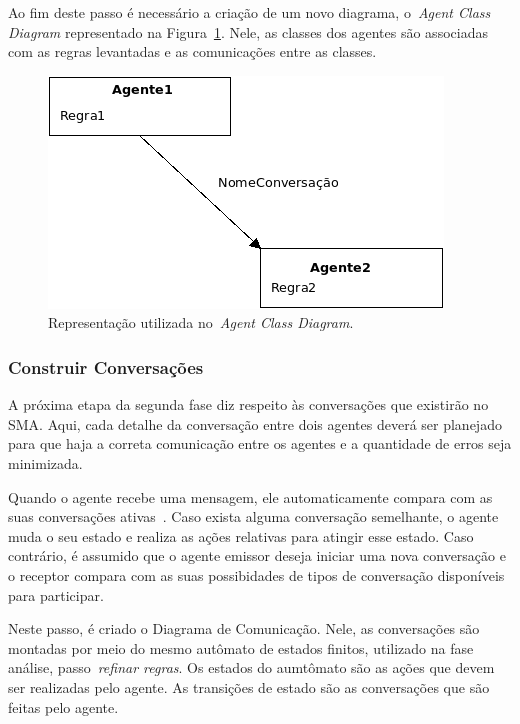 Ao fim deste passo é necessário a criação de um novo diagrama, o~\emph{Agent Class Diagram} representado na Figura~\ref{fig:exemplo-agent-class-diagram}. Nele, as classes dos agentes são associadas com as regras levantadas e as comunicações entre as classes.

\begin{figure}
	\centering
	\includegraphics[scale=0.65]{images/exemplo-agent-class-diagram.png}
	\caption{Representação utilizada no~\emph{Agent Class Diagram}.}
	\label{fig:exemplo-agent-class-diagram}
\end{figure}

\subsubsection{Construir Conversações}

A próxima etapa da segunda fase diz respeito às conversações que existirão no SMA. Aqui, cada detalhe da conversação entre dois agentes deverá ser planejado para que haja a correta comunicação entre os agentes e a quantidade de erros seja minimizada.

Quando o agente recebe uma mensagem, ele automaticamente compara com as suas conversações ativas~\cite{scott01}. Caso exista alguma conversação semelhante, o agente muda o seu estado e realiza as ações relativas para atingir esse estado. Caso contrário, é assumido que o agente emissor deseja iniciar uma nova conversação e o receptor compara com as suas possibidades de tipos de conversação disponíveis para participar.

Neste passo, é criado o Diagrama de Comunicação. Nele, as conversações são montadas por meio do mesmo autômato de estados finitos, utilizado na fase análise, passo~\emph{refinar regras}. Os estados do aumtômato são as ações que devem ser realizadas pelo agente. As transições de estado são as conversações que são feitas pelo agente.


